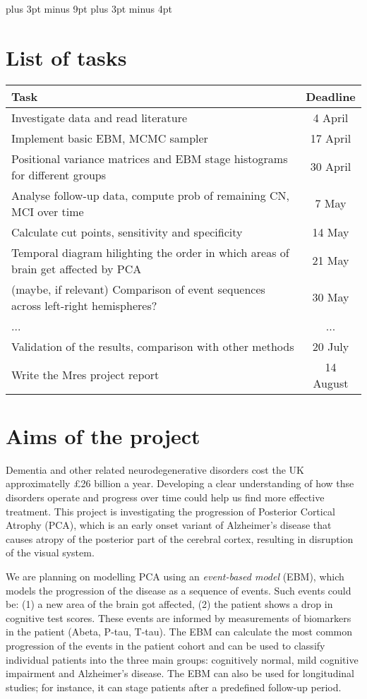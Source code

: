 \documentclass[11pt,a4paper,oneside]{report}
\begin{document}
\belowdisplayskip=12pt plus 3pt minus 9pt
\belowdisplayshortskip=7pt plus 3pt minus 4pt

\section*{List of tasks}

\renewcommand\arraystretch{4.4} %

\begin{tabular}{ l | c }
 Task & Deadline\\
 \hline
 Investigate data and read literature & 4 April\\
 Implement basic EBM, MCMC sampler & 17 April\\
 Positional variance matrices and EBM stage histograms for different groups & 30 April\\
 Analyse follow-up data, compute prob of remaining CN, MCI over time & 7 May\\
 Calculate cut points, sensitivity and specificity & 14 May\\
 Temporal diagram hilighting the order in which areas of brain get affected by PCA & 21 May\\
 (maybe, if relevant) Comparison of event sequences across left-right hemispheres? & 30 May\\
 ... & ...\\
 Validation of the results, comparison with other methods & 20 July\\
 Write the Mres project report & 14 August
 
 
\end{tabular}


\section*{Aims of the project}

Dementia and other related neurodegenerative disorders cost the UK approximatelly £26 billion a year. Developing a clear understanding of how thse disorders operate and progress over time could help us find more effective treatment. This project is investigating the progression of Posterior Cortical Atrophy (PCA), which is an early onset variant of Alzheimer's disease that  causes atropy of the posterior part of the cerebral cortex, resulting in disruption of the visual system. 

We are planning on modelling PCA using an \textit{event-based model} (EBM), which models the progression of the disease as a sequence of events. Such events could be: (1) a new area of the brain got affected, (2) the patient shows a drop in cognitive test scores. These events are informed by measurements of biomarkers in the patient (Abeta, P-tau, T-tau). The EBM can calculate the most common progression of the events in the patient cohort and can be used to classify individual patients into the three main groups: cognitively normal, mild cognitive impairment and Alzheimer's disease. The EBM can also be used for longitudinal studies; for instance, it can stage patients after a predefined follow-up period.
\end{document}
